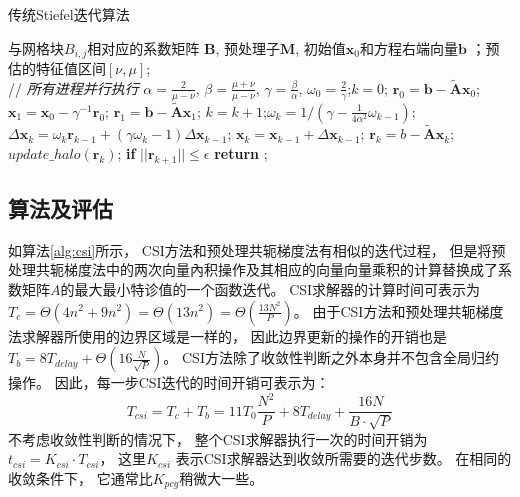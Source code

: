 \begin{algorithm}[h]
\caption{传统Stiefel迭代算法}
\label{alg:csi}
\begin{algorithmic}[1]
\REQUIRE 与网格块$B_{i,j}$相对应的系数矩阵 $\textbf{B}$, 预处理子$\textbf{M}$, 初始值$\textbf{x}_0$和方程右端向量$\textbf{b}$ ；预估的特征值区间$[\nu,\mu]$;  \\
 // \qquad    \textit{所有进程并行执行}
\STATE $\alpha =\frac{2}{\mu -\nu}$, $ \beta = \frac{\mu +\nu}{\mu -\nu}$, $\gamma = \frac{\beta}{\alpha}$, $\omega_0 =\frac{ 2}{\gamma}$;\quad $k = 0$;
\STATE $\textbf{r}_0 = \textbf{b}-\tilde{\textbf{A}}\textbf{x}_0$; $\textbf{x}_1 =\textbf{x}_0 -\gamma^{-1}\textbf{r}_0$; $\textbf{r}_1 =\textbf{b} -\tilde{\textbf{A}}\textbf{x}_1$;
\STATE $k=k+1$;\quad $\omega_k = 1/(\gamma - \frac{1}{4\alpha^2}\omega_{k-1})$; 
\STATE $\Delta \textbf{x}_{k} =\omega_k\textbf{r}_{k-1}+(\gamma \omega_k-1)\Delta \textbf{x}_{k-1}$;
\STATE $\textbf{x}_{k} =\textbf{x}_{k-1}+\Delta \textbf{x}_{k-1}$; \quad  $\textbf{r}_{k} =b- \tilde{\textbf{A}}\textbf{x}_{k}$;
\STATE $update\_halo(\textbf{r}_k)$; 
\STATE \textbf{if} $||\textbf{r}_{k+1}|| \le \epsilon$  \textbf{return} ;
\ENDIF\ENDWHILE
\end{algorithmic}
\end{algorithm}

\subsection{算法及评估}

如算法\ref{alg:csi}所示， CSI方法和预处理共轭梯度法有相似的迭代过程，
但是将预处理共轭梯度法中的两次向量內积操作及其相应的向量向量乘积的计算替换成了系数矩阵$A$的最大最小特诊值的一个函数迭代。 
CSI求解器的计算时间可表示为
$T_c = \Theta (4 n^2 + 9n^2) = \Theta (13n^2) =\Theta(\frac{13N^2}{P})$。 
由于CSI方法和预处理共轭梯度法求解器所使用的边界区域是一样的， 因此边界更新的操作的开销也是 $T_b =8T_{delay} +\Theta (16 \frac{N}{\sqrt{P}})$。 CSI方法除了收敛性判断之外本身并不包含全局归约操作。 
因此，每一步CSI迭代的时间开销可表示为： 　
\begin{equation}
\label{t_csi}
T_{csi} = T_c + T_b
= 11T_0 \frac{N^2}{P}+ 8T_{delay} + \frac{16N}{B \cdot\sqrt{P}}
\end{equation}
不考虑收敛性判断的情况下， 整个CSI求解器执行一次的时间开销为$t_{csi} = K_{csi}\cdot T_{csi}$， 这里$K_{csi}$ 表示CSI求解器达到收敛所需要的迭代步数。 在相同的收敛条件下， 它通常比$K_{pcg}$稍微大一些。 

